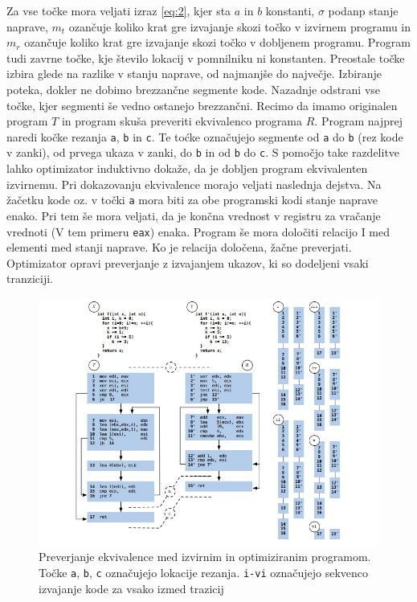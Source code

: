 \documentclass[a4paper, 12pt]{book}
\begin{document}
	 Za vse točke mora veljati izraz \ref{eq:2}, kjer sta $a$ in $b$ konstanti, $\sigma$ podanp stanje naprave, $m_t$ ozančuje koliko krat gre izvajanje skozi točko v izvirnem programu in $m_r$ ozančuje koliko krat gre izvajanje skozi točko v dobljenem programu. Program tudi zavrne točke, kje število lokacij v pomnilniku ni konstanten. Preostale točke izbira glede na razlike v stanju naprave, od najmanjše do največje. Izbiranje poteka, dokler ne dobimo brezzančne segmente kode. Nazadnje odstrani vse točke, kjer segmenti še vedno ostanejo brezzančni. Recimo da imamo originalen program $T$ in program skuša preveriti ekvivalenco programa $R$. Program najprej naredi kočke rezanja \texttt{a}, \texttt{b} in \texttt{c}. Te toćke označujejo segmente od \texttt{a} do \texttt{b} (rez kode v zanki), od prvega ukaza v zanki, do \texttt{b} in od \texttt{b} do \texttt{c}. S pomočjo take razdelitve lahko optimizator induktivno dokaže, da je dobljen program ekvivalenten izvirnemu. Pri dokazovanju ekvivalence morajo veljati naslednja dejstva. Na žačetku kode oz. v točki \texttt{a} mora biti za obe programski kodi stanje naprave enako. Pri tem še mora veljati, da je končna vrednost v registru za vračanje vrednoti (V tem primeru \texttt{eax}) enaka. Program še mora določiti relacijo I med elementi med stanji naprave. Ko je relacija določena, žačne preverjati. Optimizator opravi preverjanje z izvajanjem ukazov, ki so dodeljeni vsaki tranziciji.
	
	\begin{figure}[htb]
		\begin{center}
			\includegraphics[width=15cm]{graf1.jpg}
		\end{center}
		\caption{Preverjanje ekvivalence med izvirnim in optimiziranim programom. Točke \texttt{a}, \texttt{b}, \texttt{c} označujejo lokacije rezanja. \texttt{i-vi} označujejo sekvenco izvajanje kode za vsako izmed trazicij}
		\label{pic1}
	\end{figure}
	
\end{document}
